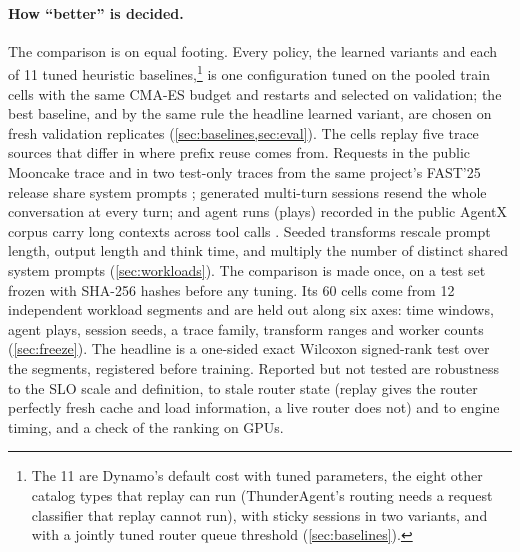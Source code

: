 \paragraph{How ``better'' is decided.}
The comparison is on equal footing. Every policy, the learned variants and each of 11 tuned
heuristic baselines,\footnote{The 11 are Dynamo's default cost with tuned parameters, the eight
  other catalog types that replay can run (ThunderAgent's routing needs a request classifier that
  replay cannot run), with sticky sessions in two variants, and  with a jointly
  tuned router queue threshold (\cref{sec:baselines}).}
is one configuration tuned on the pooled train cells with the same CMA-ES budget and restarts and
selected on validation; the best baseline, and by the same rule the headline learned variant, are
chosen on fresh validation replicates (\cref{sec:baselines,sec:eval}).
The cells replay five trace sources that differ in where prefix reuse comes from. Requests in the
public Mooncake trace and in two test-only traces from the same project's FAST'25 release share
system prompts \citep{mooncake}; generated multi-turn sessions resend the whole conversation at
every turn; and agent runs (plays) recorded in the public AgentX corpus carry long contexts across
tool calls \citep{agentxtraces}. Seeded transforms rescale prompt length, output length and think
time, and multiply the number of distinct shared system prompts (\cref{sec:workloads}).
The comparison is made once, on a test set frozen with SHA-256 hashes before any tuning. Its 60
cells come from 12 independent workload segments and are held out along six axes: time windows,
agent plays, session seeds, a trace family, transform ranges and worker counts
(\cref{sec:freeze}). The headline is a one-sided exact Wilcoxon signed-rank test over the segments,
registered before training. Reported but not tested are robustness to the SLO scale and definition,
to stale router state (replay gives the router perfectly fresh cache and load information, a live
router does not) and to engine timing, and a check of the ranking on GPUs.

